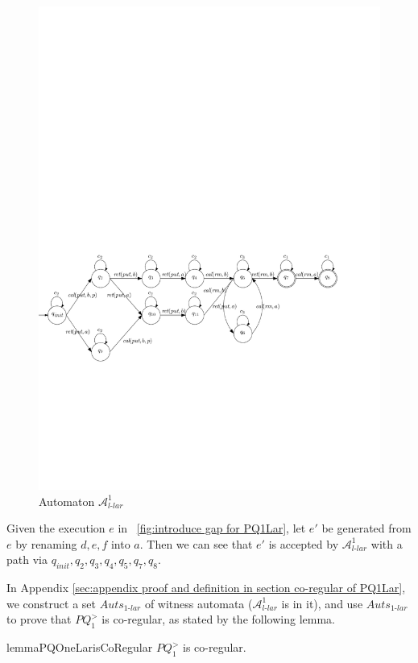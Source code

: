 \begin{figure}[htbp]
  \centering
  \includegraphics[width=1 \textwidth]{figures/PIC_AUTO_PQ1Lar-pprr.pdf}
  \caption{Automaton $\mathcal{A}_{\textit{l-lar}}^1$}
  \label{fig:automata APQ1Lar-1}
\end{figure}

Given the execution $e$ in \figurename~\ref{fig:introduce gap for PQ1Lar}, let $e'$ be generated from $e$ by renaming $d,e,f$ into $a$. Then we can see that $e'$ is accepted by $\mathcal{A}_{\textit{l-lar}}^1$ with a path via $q_{\textit{init}}, q_2, q_3, q_4,q_5,q_7,q_8$.

In Appendix \ref{sec:appendix proof and definition in section co-regular of PQ1Lar}, we construct a set $\textit{Auts}_{\textit{1-lar}}$ of witness automata ($\mathcal{A}_{\textit{l-lar}}^1$ is in it), and use $\textit{Auts}_{\textit{1-lar}}$ to prove that $\textit{PQ}_1^{>}$ is co-regular, as stated by the following lemma.

\begin{restatable}{lemma}{PQOneLarisCoRegular}
\label{lemma:PQ1Lar is co-regular}
$\textit{PQ}_1^{>}$ is co-regular.
\end{restatable}










